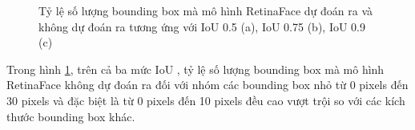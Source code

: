 {    \begin{figure}[H]
        \centering
        \caption{Tỷ lệ số lượng bounding box  mà mô hình RetinaFace dự đoán ra và không dự đoán ra tương ứng với IoU  0.5 (a), IoU  0.75 (b), IoU  0.9 (c)}
        \label{fig:retinafocus_iou_compare_percent}
    \end{figure}

    \noindent
    Trong hình \ref{fig:retinafocus_iou_compare_percent}, trên cả ba mức IoU , tỷ lệ số lượng bounding box  mà mô hình RetinaFace không dự đoán ra đối với nhóm các bounding box  nhỏ từ 0 pixels  đến 30 pixels  và đặc biệt là từ 0 pixels  đến 10 pixels  đều cao vượt trội so với các kích thước bounding box  khác.

}
